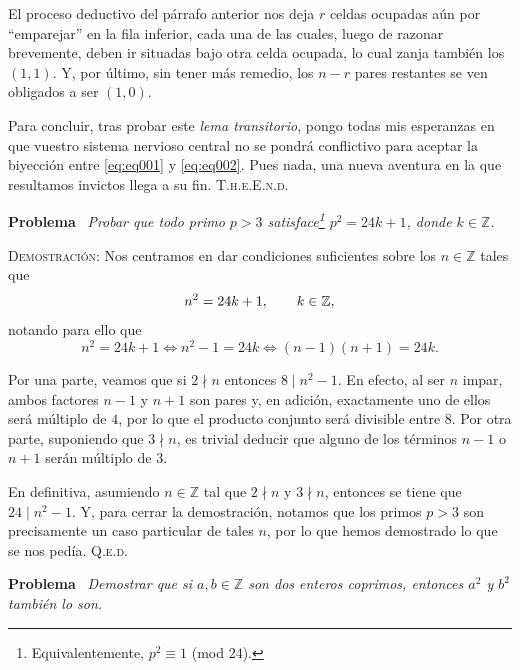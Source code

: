 \documentclass{article}
\begin{document}
El proceso deductivo del párrafo anterior nos deja $r$ celdas ocupadas aún por ``emparejar'' en la fila inferior, cada una de las cuales, luego de razonar brevemente, deben ir situadas bajo otra celda ocupada, lo cual zanja también los $(1, 1)$. Y, por último, sin tener más remedio, los $n - r$ pares restantes se ven obligados a ser $(1, 0)$.

Para concluir, tras probar este \textit{lema transitorio}, pongo todas mis esperanzas en que vuestro sistema nervioso central no se pondrá conflictivo para aceptar la biyección entre \eqref{eq:eq001} y \eqref{eq:eq002}. Pues nada, una nueva aventura en la que resultamos invictos llega a su fin. \hfill{\textsc{T.h.e.E.n.d.}}

\newpage

\noindent\textbf{Problema} \, \textit{Probar que todo primo $p > 3$ satisface\footnote{Equivalentemente, $p^2 \equiv 1$ (mod $24$).} $p^2 = 24k + 1$, donde $k \in \mathbb{Z}$.}

\vspace{7px}

\noindent\textsc{Demostración}: Nos centramos en dar condiciones suficientes sobre los $n \in \mathbb{Z}$ tales que \[n^2 = 24k + 1, \hspace{20px} k \in \mathbb{Z},\] notando para ello que \[n^2 = 24k + 1 \iff n^2 - 1 = 24k \iff (n - 1)(n + 1) = 24k.\]

Por una parte, veamos que si $2 \nmid n$ entonces $8 \mid n^2 - 1$. En efecto, al ser $n$ impar, ambos factores $n - 1$ y $n + 1$ son pares y, en adición, exactamente uno de ellos será múltiplo de $4$, por lo que el producto conjunto será divisible entre $8$.
Por otra parte, suponiendo que $3 \nmid n$, es trivial deducir que alguno de los términos $n - 1$ o $n + 1$ serán múltiplo de $3$.

En definitiva, asumiendo $n \in \mathbb{Z}$ tal que $2 \nmid n$ y $3 \nmid n$, entonces se tiene que $24 \mid n^2 - 1$. Y, para cerrar la demostración, notamos que los primos $p > 3$ son precisamente un caso particular de tales $n$, por lo que hemos demostrado lo que se nos pedía. \hfill{\textsc{Q.e.d.}}

\vspace{12px}

\noindent\textbf{Problema} \, \textit{Demostrar que si $a, b \in \mathbb{Z}$ son dos enteros coprimos, entonces $a^2$ y $b^2$ también lo son.}

\vspace{7px}
\end{document}
